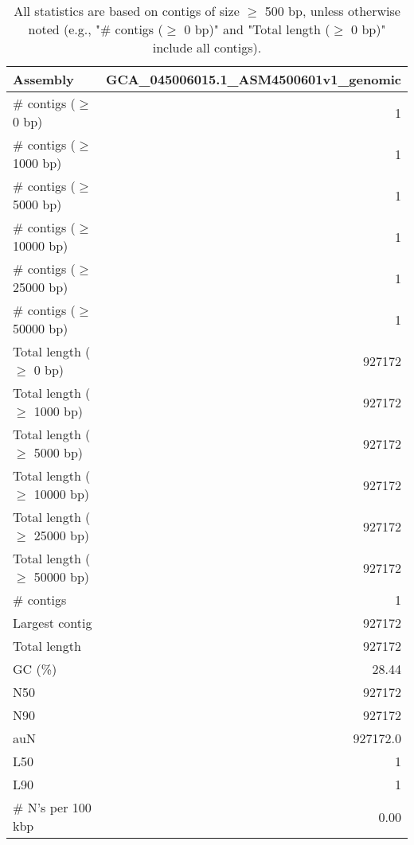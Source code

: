 \documentclass[12pt,a4paper]{article}
\begin{document}
\begin{table}[ht]
\begin{center}
\caption{All statistics are based on contigs of size $\geq$ 500 bp, unless otherwise noted (e.g., "\# contigs ($\geq$ 0 bp)" and "Total length ($\geq$ 0 bp)" include all contigs).}
\begin{tabular}{|l*{1}{|r}|}
\hline
Assembly & GCA\_045006015.1\_ASM4500601v1\_genomic \\ \hline
\# contigs ($\geq$ 0 bp) & 1 \\ \hline
\# contigs ($\geq$ 1000 bp) & 1 \\ \hline
\# contigs ($\geq$ 5000 bp) & 1 \\ \hline
\# contigs ($\geq$ 10000 bp) & 1 \\ \hline
\# contigs ($\geq$ 25000 bp) & 1 \\ \hline
\# contigs ($\geq$ 50000 bp) & 1 \\ \hline
Total length ($\geq$ 0 bp) & 927172 \\ \hline
Total length ($\geq$ 1000 bp) & 927172 \\ \hline
Total length ($\geq$ 5000 bp) & 927172 \\ \hline
Total length ($\geq$ 10000 bp) & 927172 \\ \hline
Total length ($\geq$ 25000 bp) & 927172 \\ \hline
Total length ($\geq$ 50000 bp) & 927172 \\ \hline
\# contigs & 1 \\ \hline
Largest contig & 927172 \\ \hline
Total length & 927172 \\ \hline
GC (\%) & 28.44 \\ \hline
N50 & 927172 \\ \hline
N90 & 927172 \\ \hline
auN & 927172.0 \\ \hline
L50 & 1 \\ \hline
L90 & 1 \\ \hline
\# N's per 100 kbp & 0.00 \\ \hline
\end{tabular}
\end{center}
\end{table}
\end{document}
